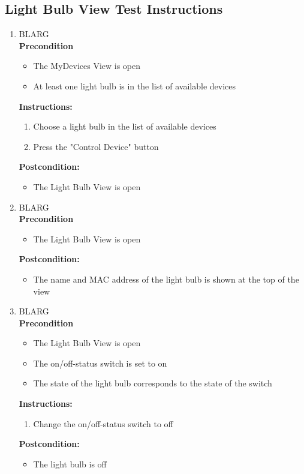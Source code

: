 \documentclass[a4paper]{article}
\newlength{\testlabellength}
\newenvironment{testlist}{\begin{enumerate}[label=\bfseries Instruction \thesubsection.\arabic* , labelindent=0pt, labelwidth=\testlabellength , leftmargin=2cm]}{\end{enumerate}}
\newenvironment{precondition}{
{\color{white}BLARG}\\ 
\textbf{Precondition}
\begin{itemize}[labelindent=0cm, labelwidth=2cm , leftmargin=1cm]
}
{\end{itemize}}
\newenvironment{instruction}{
\textbf{Instructions:}
\begin{enumerate}[label=\bfseries  \arabic*., labelindent=0cm, labelwidth=2cm , leftmargin=1cm]
}
{\end{enumerate}}
\newenvironment{postcondition}{
\textbf{Postcondition:}
\begin{itemize}[labelindent=0cm, labelwidth=2cm , leftmargin=1cm]
}
{\end{itemize}}
\begin{document}
\begin{appendices}
\subsection{Light Bulb View Test Instructions}
\begin{testlist}

    \item
    	\begin{precondition}
    		\item The MyDevices View is open
    		\item At least one light bulb is in the list of available devices
    	\end{precondition}
    	\begin{instruction}
    			\item Choose a light bulb in the list of available devices
    			\item Press the "Control Device" button
    	\end{instruction}
    	\begin{postcondition}
    		\item The Light Bulb View is open
    	\end{postcondition}

	
	\item
		\begin{precondition}
			\item The Light Bulb View is open
		\end{precondition}
    	\begin{postcondition}
    		\item The name and MAC address of the light bulb is shown at the top of the view
    	\end{postcondition}
    	
	
	\item
		\begin{precondition}
			\item The Light Bulb View is open
			\item The on/off-status switch is set to on
			\item The state of the light bulb corresponds to the state of the switch
		\end{precondition}
    	\begin{instruction}
    		\item Change the on/off-status switch to off
    	\end{instruction}
    	\begin{postcondition}
    		\item The light bulb is off
    	\end{postcondition}  		
  

\end{testlist}
\end{appendices}
\end{document}
